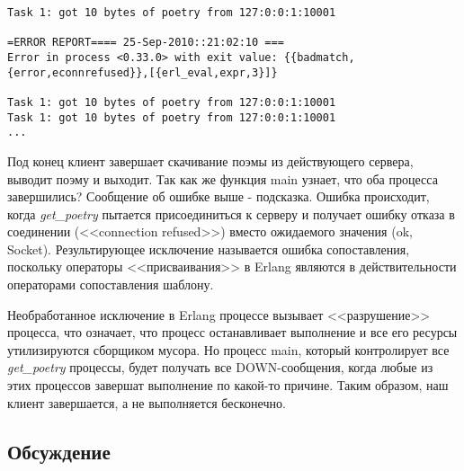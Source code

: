  \begin{verbatim}
Task 1: got 10 bytes of poetry from 127:0:0:1:10001

=ERROR REPORT==== 25-Sep-2010::21:02:10 ===
Error in process <0.33.0> with exit value: {{badmatch,{error,econnrefused}},[{erl_eval,expr,3}]}

Task 1: got 10 bytes of poetry from 127:0:0:1:10001
Task 1: got 10 bytes of poetry from 127:0:0:1:10001
...
\end{verbatim} 

Под конец клиент завершает скачивание поэмы из 
действующего сервера, выводит поэму и выходит. 
Так как же функция main узнает, что оба процесса 
завершились? Сообщение об ошибке выше - подсказка. 
Ошибка происходит, когда \textit{get\_poetry} пытается 
присоединиться к серверу и получает ошибку отказа в 
соединении (<<connection refused>>) вместо ожидаемого значения ({ok, Socket}). 
Результирующее исключение называется ошибка сопоставления, 
поскольку операторы <<присваивания>> в Erlang являются в 
действительности операторами сопоставления шаблону.
  

Необработанное исключение в Erlang процессе вызывает 
<<разрушение>> процесса, что означает, что процесс останавливает 
выполнение и все его ресурсы утилизируются сборщиком мусора. 
Но процесс main, который контролирует все \textit{get\_poetry} 
процессы, будет получать все DOWN-сообщения, когда любые из 
этих процессов завершат выполнение по какой-то причине. 
Таким образом, наш клиент завершается, а не выполняется бесконечно. 

\subsection{Обсуждение}

